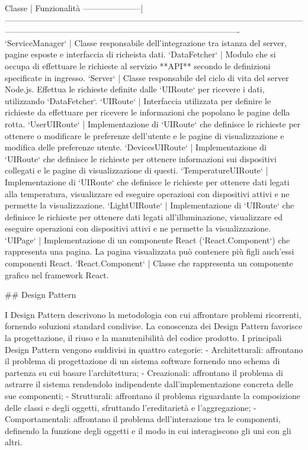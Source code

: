 Classe               | Funzionalità
---------------------|-------------------------------------------------------------------------------------------------------------------------------------------------------------------------------------------------
`ServiceManager`     | Classe responsabile dell'integrazione tra istanza del server, pagine esposte e interfaccia di richeista dati.
`DataFetcher`  | Modulo che si occupa di effettuare le richieste al servizio **API** secondo le definizioni specificate in ingresso.
`Server`             | Classe responsabile del ciclo di vita del server Node.js. Effettua le richieste definite dalle `UIRoute` per ricevere i dati, utilizzando `DataFetcher`.
`UIRoute`            | Interfaccia utilizzata per definire le richieste da effettuare per ricevere le informazioni che popolano le pagine della rotta.
`UserUIRoute`        | Implementazione di `UIRoute` che definisce le richieste per ottenere o modificare le preferenze dell'utente e le pagine di visualizzazione e modifica delle preferenze utente.
`DevicesUIRoute`     | Implementazione di `UIRoute` che definisce le richieste per ottenere informazioni sui dispositivi collegati e le pagine di visualizzazione di questi.
`TemperatureUIRoute` | Implementazione di `UIRoute` che definisce le richieste per ottenere dati legati alla temperatura, visualizzare ed eseguire operazioni con dispositivi attivi e ne permette la visualizzazione.
`LightUIRoute`       | Implementazione di `UIRoute` che definisce le richieste per ottenere dati legati all'illuminazione, visualizzare ed eseguire operazioni con dispositivi attivi e ne permette la visualizzazione.
`UIPage`             | Implementazione di un componente React (`React.Component`) che rappresenta una pagina. La pagina visualizzata può contenere più figli anch'essi componenti React.
`React.Component`    | Classe che rappresenta un componente grafico nel framework React.


## Design Pattern

I Design Pattern descrivono la metodologia con cui affrontare problemi ricorrenti, fornendo soluzioni standard condivise.
La conoscenza dei Design Pattern favorisce la progettazione, il riuso e la manutenibilità del codice prodotto.
I principali Design Pattern vengono suddivisi in quattro categorie:
-   Architetturali: affrontano il problema di progettazione di un sistema software fornendo uno schema di partenza su cui basare l’architettura;
-   Creazionali: affrontano il problema di astrarre il sistema rendendolo indipendente dall’implementazione concreta delle sue componenti;
-   Strutturali: affrontano il problema riguardante la composizione delle classi e degli oggetti, sfruttando l’ereditarietà e l’aggregazione;
-   Comportamentali: affrontano il problema dell’interazione tra le componenti, definendo la funzione degli oggetti e il modo in cui interagiscono gli uni con gli altri.

